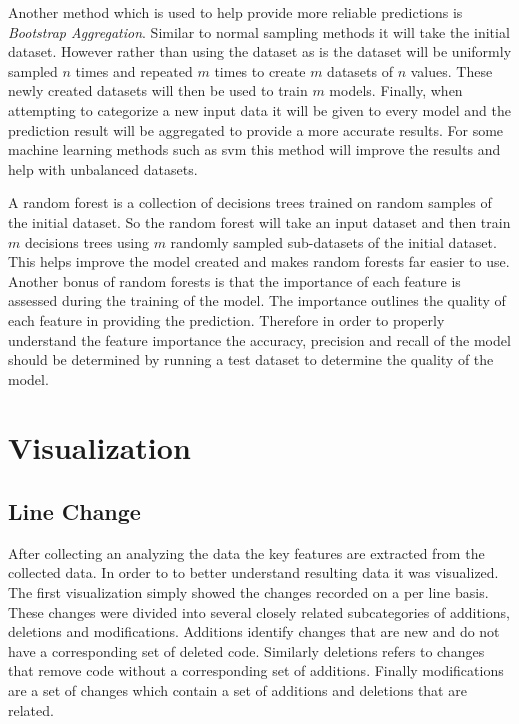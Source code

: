 Another method which is used to help provide more reliable predictions is \textit{Bootstrap Aggregation}. Similar to normal sampling methods it will take the initial dataset. However rather than using the dataset as is the dataset will be uniformly sampled $n$ times and repeated $m$ times to create $m$ datasets of $n$ values. These newly created datasets will then be used to train $m$ models. Finally, when attempting to categorize a new input data it will be given to every model and the prediction result will be aggregated to provide a more accurate results. For some machine learning methods such as \gls{svm} this method will improve the results and help with unbalanced datasets.

A random forest is a collection of decisions trees trained on random samples of the initial dataset. So the random forest will take an input dataset and then train $m$ decisions trees using $m$ randomly sampled sub-datasets of the initial dataset. This helps improve the model created and makes random forests far easier to use. Another bonus of random forests is that the importance of each feature is assessed during the training of the model. The importance outlines the quality of each feature in providing the prediction. Therefore in order to properly understand the feature importance the accuracy, precision and recall of the model should be determined by running a test dataset to determine the quality of the model.

\section{Visualization}

\subsection{Line Change}


After collecting an analyzing the data the key features are extracted from the collected data. In order to to better understand resulting data it was visualized. The first visualization simply showed the changes recorded on a per line basis. These changes were divided into several closely related subcategories of additions, deletions and modifications. Additions identify changes that are new and do not have a corresponding set of deleted code. Similarly deletions refers to changes that remove code without a corresponding set of additions. Finally modifications are a set of changes which contain a set of additions and deletions that are related.

